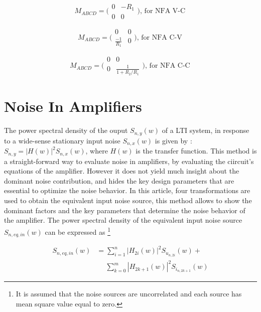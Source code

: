 \documentclass[letterpaper]{ecctd01}
\begin{document}
\begin{equation}\label{eq:mabcd2}
M_{ABCD}=\bigg(\begin{array}{cc}
0&-R_1\\
0&0
\end{array}\bigg){,\text{ for NFA V-C}}
\end{equation}

\begin{equation}\label{eq:mabcd3}
M_{ABCD}=\bigg(\begin{array}{cc}
0&0\\
\frac{-1}{R_1}&0
\end{array}\bigg){,\text{ for NFA C-V}}
\end{equation}

\begin{equation}\label{eq:mabcd4}
M_{ABCD}=\bigg(\begin{array}{cc}
0&0\\
0&\frac{1}{1+R_2/R_1}
\end{array}\bigg){,\text{ for NFA C-C}}
\end{equation}

\section{Noise In Amplifiers}

The power spectral density of the ouput $S_{n,y}(w)$ of a LTI system, in response to a wide-sense stationary input noise $S_{n,x}(w)$ is given by \cite{davenport,peebles}: $S_{n,y}=|H(w)|^2S_{n,x}(w)$, where $H(w)$ is the transfer function. This method is a straight-forward way to evaluate noise in amplifiers, by evaluating the ciircuit's equations of the amplifier. However it does not yield much insight about the dominant noise contribution, and hides the key design parameters that are essential to optimize the noise behavior. In this article, four transformations are used to obtain the equivalent input noise source, this method allows to show the dominant factors and the key parameters that determine the noise behavior of the amplifier. The power spectral density of the equivalent input noise source $S_{n,eq,in}(w)$ can be expressed as \footnote{It is assumed that the noise sources are uncorrelated and each source has mean square value equal to zero.}

\begin{equation}\label{eq:density}
\begin{split}
S_{n,eq,in}(w)& =\sum_{i=1}^n|H_{2i}(w)|^2S_{u_{n,2i}}(w)+\\
& \quad \; \sum_{k=0}^m|H_{2k+1}(w)|^2S_{i_{n,2k+1}}(w)
\end{split}
\end{equation}
\end{document}
